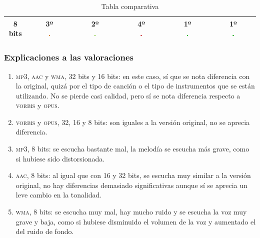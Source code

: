 \documentclass[11pt,a4paper]{article}
\begin{document}
\begin{table}[H]
\begin{tabular}{|c|c|c|c|c|c|}
 8 bits & \makecell{3º\\ \includegraphics[width=0.03\textwidth]{m.png}} & \makecell{2º\\ \includegraphics[width=0.03\textwidth]{b.png}} & \makecell{4º\\ \includegraphics[width=0.03\textwidth]{mm.png}} & \makecell{1º\\ \includegraphics[width=0.03\textwidth]{mb.png}} & \makecell{1º\\ \includegraphics[width=0.03\textwidth]{mb.png}} \\ \hline
\end{tabular}
\caption{Tabla comparativa}
\label{my-label}
\end{table}

\subsubsection{Explicaciones a las valoraciones}
\begin{enumerate}
	\item \textsc{mp3, aac} y \textsc{wma}, 32 bits y 16 bits: en este caso, sí que se nota diferencia con la original, quizá por el tipo de canción o el tipo de instrumentos que se están utilizando. No se pierde casi calidad, pero sí se nota diferencia respecto a \textsc{vorbis} y \textsc{opus}.
	\item \textsc{vorbis} y \textsc{opus}, 32, 16 y 8 bits: son iguales a la versión original, no se aprecia diferencia.
	\item \textsc{mp3}, 8 bits: se escucha bastante mal, la melodía se escucha más grave, como si hubiese sido distorsionada.
	\item \textsc{aac}, 8 bits: al igual que con 16 y 32 bits, se escucha muy similar a la versión original, no hay diferencias demasiado significativas aunque sí se aprecia un leve cambio en la tonalidad.
	\item \textsc{wma}, 8 bits: se escucha muy mal, hay mucho ruido y se escucha la voz muy grave y baja, como si hubiese disminuido el volumen de la voz y aumentado el del ruido de fondo.
\end{enumerate}
\end{document}
